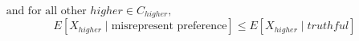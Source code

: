 \documentclass[letterpaper]{article} %
\begin{document}
$\text{ and for all other } higher \in C_{higher},$
\begin{equation}
E[X_{higher} \mid \text{misrepresent preference}] \le E[X_{higher} \mid truthful]
\end{equation}
\end{document}
